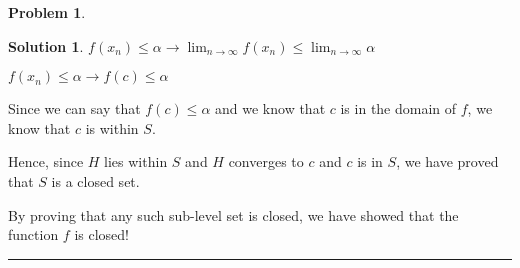 \documentclass{article}
\theoremstyle{definition}
\newtheorem{problem}{Problem}
\def\fline{\rule{0.75\linewidth}{0.5pt}}
\newcommand{\finishline}{\begin{center}\fline\end{center}}
\newtheorem*{solution*}{Solution}
\newenvironment{solution}{\begin{solution*}}{{\finishline} \end{solution*}}
\begin{document}
\begin{problem}
\begin{solution}
$f(x_n) \leq \alpha \rightarrow \lim_{n\to\infty} f(x_n) \leq \lim_{n\to\infty} \alpha$ \newline 

$f(x_n) \leq \alpha \rightarrow f(c) \leq \alpha$ \newline 

Since we can say that $f(c) \leq \alpha$ and we know that $c$ is in the domain of $f$, we know that $c$ is within $S$. \newline 


Hence, since $H$ lies within $S$ and $H$ converges to $c$ and $c$ is in $S$, we have proved that $S$ is a closed set. \newline 


By proving that any such sub-level set is closed, we have showed that the function $f$ is closed! \newline 
\end{solution}
    



\end{problem}
\end{document}
